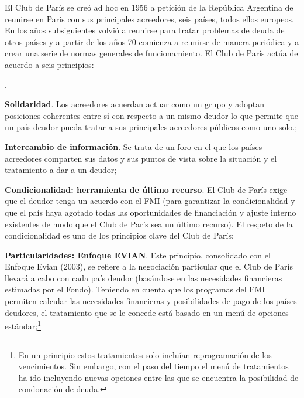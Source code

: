 \documentclass[10pt,a4paper]{article}
\newcounter{numitem}
\newenvironment{lnum}
      {\begin{list}{\arabic{numitem}.}{%
          \usecounter{numitem}%
          \setlength{\leftmargin}{1cm}%
          \setlength{\parskip}{3pt}%
          \setlength{\itemsep}{0pt}%
          \setlength{\parsep}{0pt}%
      }}
      {\end{list}}
\begin{document}
El Club de París se creó ad hoc en 1956 a petición de la República Argentina de reunirse en Paris con sus principales acreedores, seis países, todos ellos europeos. En los años subsiguientes volvió a reunirse para tratar problemas de deuda de otros países y a partir de los años 70 comienza a reunirse de manera periódica y a crear una serie de normas generales de funcionamiento. El Club de París actúa de acuerdo a seis principios:
\begin{lnum}
    \item \textbf{Solidaridad}. Los acreedores acuerdan actuar como un grupo y adoptan posiciones coherentes entre sí con respecto a un mismo deudor lo que permite que un país deudor pueda tratar a sus principales acreedores públicos como uno solo.;
    \item \textbf{Intercambio de información}. Se trata de un foro en el que los países acreedores comparten sus datos y sus puntos de vista sobre la situación y el tratamiento a dar a un deudor;
    \item \textbf{Condicionalidad: herramienta de último recurso}. El Club de París exige que el deudor tenga un acuerdo con el FMI (para garantizar la condicionalidad y que el país haya agotado todas las oportunidades de financiación y ajuste interno existentes de modo que el Club de París sea un último recurso). El respeto de la condicionalidad es uno de los principios clave del Club de París;
    \item \textbf{Particularidades: Enfoque EVIAN}. Este principio, consolidado con el Enfoque Evian (2003), se refiere a la negociación particular que el Club de París llevará a cabo con cada país deudor (basándose en las necesidades financieras estimadas por el Fondo). Teniendo en cuenta que los programas del FMI permiten calcular las necesidades financieras y posibilidades de pago de los países deudores, el tratamiento que se le concede está basado en un menú de opciones estándar;\footnote{%
        En un principio estos tratamientos solo incluían reprogramación de los vencimientos. Sin embargo, con el paso del tiempo el menú de tratamientos ha ido incluyendo nuevas opciones entre las que se encuentra la posibilidad de condonación de deuda. 
    
}
\end{lnum}
\end{document}
